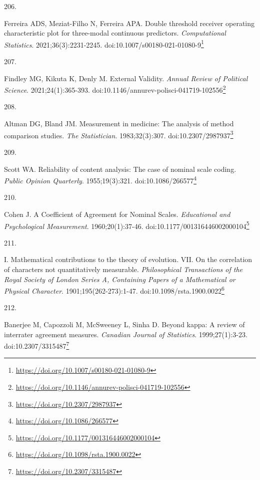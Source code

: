 \documentclass[
  a4paper,
]{book}
\newlength{\cslhangindent}
\newlength{\csllabelwidth}
\newlength{\cslentryspacingunit} %
\newenvironment{CSLReferences}[2] %
 {%
  \setlength{\parindent}{0pt}
  \ifodd #1
  \let\oldpar\par
  \def\par{\hangindent=\cslhangindent\oldpar}
  \fi
  \setlength{\parskip}{#2\cslentryspacingunit}
 }%
 {}
\newcommand{\CSLLeftMargin}[1]{\parbox[t]{\csllabelwidth}{#1}}
\newcommand{\CSLRightInline}[1]{\parbox[t]{\linewidth - \csllabelwidth}{#1}\break}
\renewcommand{\href}[2]{#2\footnote{\url{#1}}}
\begin{document}
\begin{CSLReferences}{0}{0}
\leavevmode{}%
\CSLLeftMargin{206. }%
\CSLRightInline{Ferreira ADS, Meziat-Filho N, Ferreira APA. Double threshold receiver operating characteristic plot for three-modal continuous predictors. \emph{Computational Statistics}. 2021;36(3):2231-2245. doi:\href{https://doi.org/10.1007/s00180-021-01080-9}{10.1007/s00180-021-01080-9}}

\leavevmode{}%
\CSLLeftMargin{207. }%
\CSLRightInline{Findley MG, Kikuta K, Denly M. External Validity. \emph{Annual Review of Political Science}. 2021;24(1):365-393. doi:\href{https://doi.org/10.1146/annurev-polisci-041719-102556}{10.1146/annurev-polisci-041719-102556}}

\leavevmode{}%
\CSLLeftMargin{208. }%
\CSLRightInline{Altman DG, Bland JM. Measurement in medicine: The analysis of method comparison studies. \emph{The Statistician}. 1983;32(3):307. doi:\href{https://doi.org/10.2307/2987937}{10.2307/2987937}}

\leavevmode{}%
\CSLLeftMargin{209. }%
\CSLRightInline{Scott WA. Reliability of content analysis: The case of nominal scale coding. \emph{Public Opinion Quarterly}. 1955;19(3):321. doi:\href{https://doi.org/10.1086/266577}{10.1086/266577}}

\leavevmode{}%
\CSLLeftMargin{210. }%
\CSLRightInline{Cohen J. A Coefficient of Agreement for Nominal Scales. \emph{Educational and Psychological Measurement}. 1960;20(1):37-46. doi:\href{https://doi.org/10.1177/001316446002000104}{10.1177/001316446002000104}}

\leavevmode{}%
\CSLLeftMargin{211. }%
\CSLRightInline{I. Mathematical contributions to the theory of evolution. {\textemdash}VII. On the correlation of characters not quantitatively measurable. \emph{Philosophical Transactions of the Royal Society of London Series A, Containing Papers of a Mathematical or Physical Character}. 1901;195(262-273):1-47. doi:\href{https://doi.org/10.1098/rsta.1900.0022}{10.1098/rsta.1900.0022}}

\leavevmode{}%
\CSLLeftMargin{212. }%
\CSLRightInline{Banerjee M, Capozzoli M, McSweeney L, Sinha D. Beyond kappa: A review of interrater agreement measures. \emph{Canadian Journal of Statistics}. 1999;27(1):3-23. doi:\href{https://doi.org/10.2307/3315487}{10.2307/3315487}}


\end{CSLReferences}
\end{document}
